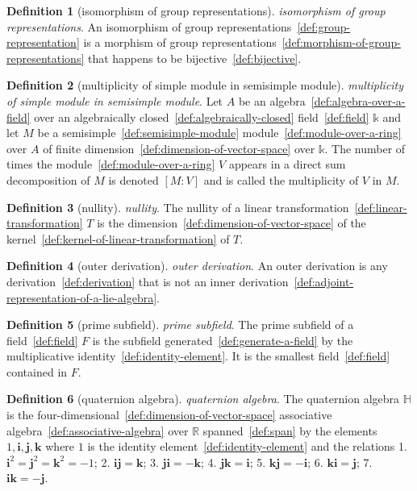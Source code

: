 \documentclass[12pt,a4paper]{article}
\theoremstyle{definition}
\newtheorem{definition}{Definition}
\begin{document}
\begin{definition}[isomorphism of group representations]\label{def:isomorphism-of-group-representations}
\emph{isomorphism of group representations}. An isomorphism of group representations~\ref{def:group-representation} is a morphism of group representations~\ref{def:morphism-of-group-representations} that happens to be bijective~\ref{def:bijective}.
\end{definition}

\begin{definition}[multiplicity of simple module in semisimple module]\label{def:multiplicity-of-simple-module-in-semisimple-module}
\emph{multiplicity of simple module in semisimple module}. Let $A$ be an algebra~\ref{def:algebra-over-a-field} over an algebraically closed~\ref{def:algebraically-closed} field~\ref{def:field} $\mathbb k$ and let $M$ be a semisimple~\ref{def:semisimple-module} module~\ref{def:module-over-a-ring} over $A$ of finite dimension~\ref{def:dimension-of-vector-space} over $\mathbb k$. The number of times the module~\ref{def:module-over-a-ring} $V$ appears in a direct sum decomposition of $M$ is denoted $[M:V]$ and is called the multiplicity of $V$ in $M$.
\end{definition}

\begin{definition}[nullity]\label{def:nullity}
\emph{nullity}. The nullity of a linear transformation~\ref{def:linear-transformation} $T$ is the dimension~\ref{def:dimension-of-vector-space} of the kernel~\ref{def:kernel-of-linear-transformation} of $T$.
\end{definition}

\begin{definition}[outer derivation]\label{def:outer-derivation}
\emph{outer derivation}. An outer derivation is any derivation~\ref{def:derivation} that is not an inner derivation~\ref{def:adjoint-representation-of-a-lie-algebra}.
\end{definition}

\begin{definition}[prime subfield]\label{def:prime-subfield}
\emph{prime subfield}. The prime subfield of a field~\ref{def:field} $F$ is the subfield generated~\ref{def:generate-a-field} by the multiplicative identity~\ref{def:identity-element}. It is the smallest field~\ref{def:field} contained in $F$.
\end{definition}

\begin{definition}[quaternion algebra]\label{def:quaternion-algebra}
\emph{quaternion algebra}. The quaternion algebra $\mathbb H$ is the four-dimensional~\ref{def:dimension-of-vector-space} associative algebra~\ref{def:associative-algebra} over $\mathbb R$ spanned~\ref{def:span} by the elements $1,\mathbf i,\mathbf j,\mathbf k$ where $1$ is the identity element~\ref{def:identity-element} and the relations
1. $\mathbf i^2 = \mathbf j^2 = \mathbf k^2 = -1$;
2. $\mathbf{ij} = \mathbf k$;
3. $\mathbf{ji} = -\mathbf k$;
4. $\mathbf{jk} = \mathbf i$;
5. $\mathbf{kj} =-\mathbf i$;
6. $\mathbf{ki} = \mathbf j$;
7. $\mathbf{ik} = -\mathbf j$.
\end{definition}
\end{document}
